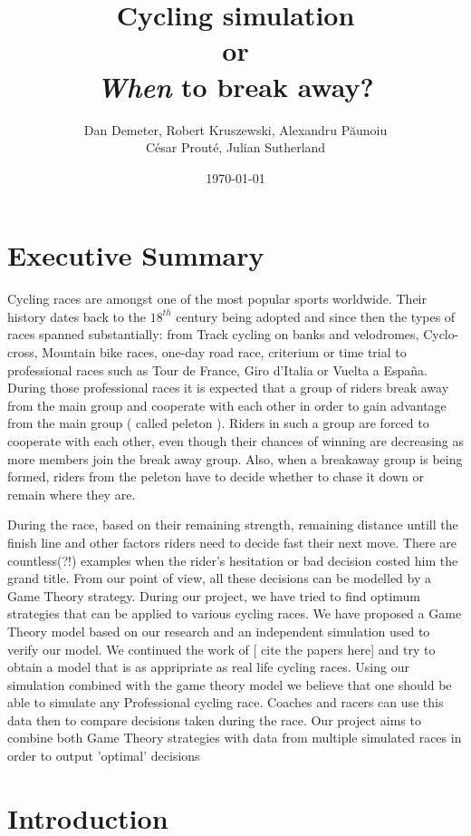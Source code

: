 \documentclass[10pt, a4paper]{report}
\title{Cycling simulation\\or\\\textit{When} to break away?}
\date{\today}
\author{Dan Demeter, Robert Kruszewski, Alexandru P\u{a}unoiu\\ C\'esar Prout\'e, Julian Sutherland}
\begin{document}
\maketitle

\tableofcontents

\chapter{Executive Summary}

Cycling races are amongst one of the most popular sports worldwide. Their history dates back to the 
$18^{th}$ century being adopted and since then the types of races spanned substantially: from Track cycling on banks and velodromes,
Cyclo-cross, Mountain bike races, one-day road race, criterium or time trial to professional races such as 
Tour de France, Giro d'Italia or Vuelta a Espa\~na. During those professional races it is expected that a group of riders break away
from the main group and cooperate with each other in order to gain advantage from the main group ( called peleton ). Riders in such a 
group are forced to cooperate with each other, even though their chances of winning are decreasing as more members join the break away 
group. Also, when a breakaway group is being formed, riders from the peleton have to decide whether to chase it down or remain where 
they are.  

During the race, based on their remaining strength, remaining distance untill the finish line and other factors riders need to decide 
fast their next move. There are countless(?!) examples when the rider's hesitation or bad decision costed him the grand title. From our 
%
point of view, all these decisions can be modelled by a Game Theory strategy. During our project, we have tried to find optimum strategies that can be applied to various cycling races. We have proposed a Game Theory model based on our research and an independent simulation used to verify our model. We continued the work of [ cite the papers here] and try to obtain a model that is as appripriate as real life cycling races. Using our simulation combined with the game theory model we believe that one should be able to simulate any Professional cycling race. Coaches and racers can use this data then to compare decisions taken  during the race. Our project aims to combine both Game Theory strategies with data from multiple simulated races in order to output 'optimal' decisions 


\chapter{Introduction}
\end{document}
